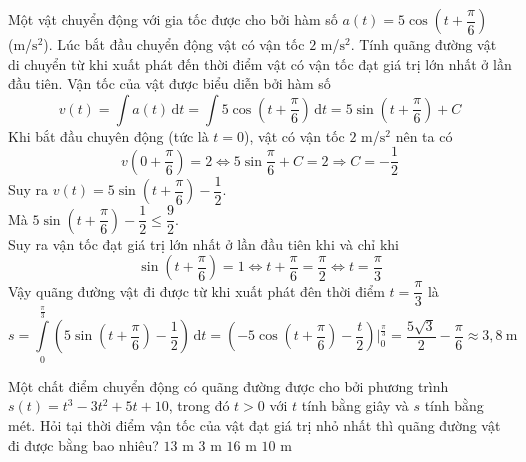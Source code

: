 \begin{bt}%
	Một vật chuyển động với gia tốc được cho bởi hàm số $a(t)=5\cos\left(t+\dfrac{\pi}{6}\right)$ (m/$\mathrm{s}^2$). Lúc bắt đầu chuyển động vật có vận tốc $2$ m/$\mathrm{s}^2$. Tính quãng đường vật di chuyển từ khi xuất phát đến thời điểm vật có vận tốc đạt giá trị lớn nhất ở lần đầu tiên.
	\loigiai
	{Vận tốc của vật được biểu diễn bởi hàm số $$v(t)=\displaystyle\int a(t)\mathrm{\,d}t=\displaystyle\int 5\cos\left(t+\dfrac{\pi}{6}\right)\mathrm{\,d}t=5\sin\left(t+\dfrac{\pi}{6}\right)+C$$
		Khi bắt đầu chuyên động (tức là $t=0$), vật có vận tốc $2$ m/$\mathrm{s}^2$ nên ta có$$v\left(0+\dfrac{\pi}{6}\right)=2\Leftrightarrow 5\sin\dfrac{\pi}{6}+C=2\Rightarrow C=-\dfrac{1}{2}$$
		Suy ra $v(t)=5\sin\left(t+\dfrac{\pi}{6}\right)-\dfrac{1}{2}$.\\
		Mà $5\sin\left(t+\dfrac{\pi}{6}\right)-\dfrac{1}{2}\leq \dfrac{9}{2}$.\\
		Suy ra vận tốc đạt giá trị lớn nhất ở lần đầu tiên khi và chỉ khi $$\sin\left(t+\dfrac{\pi}{6}\right)=1\Leftrightarrow t+\dfrac{\pi}{6}=\dfrac{\pi}{2}\Leftrightarrow t=\dfrac{\pi}{3}$$
		Vậy quãng đường vật đi được từ khi xuất phát đên thời điểm $t=\dfrac{\pi}{3}$ là 
		$$s=\displaystyle\int\limits_{0}^{\frac{\pi}{3}}\left(5\sin\left(t+\dfrac{\pi}{6}\right)-\dfrac{1}{2}\right)\mathrm{\,d}t=\left(-5\cos\left(t+\dfrac{\pi}{6}\right)-\dfrac{t}{2}\right)\Big|_0^{\frac{\pi}{3}}=\dfrac{5\sqrt{3}}{2}-\dfrac{\pi}{6}\approx 3{,}8~\mathrm{m}$$ 
	}
\end{bt}

\begin{ex}%
	Một chất điểm chuyển động có quãng đường được cho bởi phương trình $s(t)=t^{3}-3t^{2}+5t+10$, trong đó $t>0$ với $t$ tính bằng giây và $s$ tính bằng mét.  Hỏi tại thời điểm vận tốc của vật đạt giá trị nhỏ nhất thì quãng đường vật đi được bằng bao nhiêu?
	 \choice
		{\True $13$ m} 
		{$3$  m}
		{$16$ m} 
		 {$10$ m}
\end{ex}

